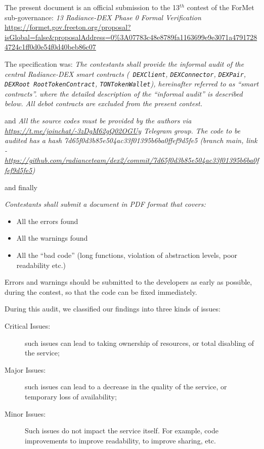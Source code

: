 
The present document is an official submission to the 13$^{th}$
contest of the ForMet sub-governance: {\em 13 Radiance-DEX Phase 0
  Formal Verification}
\url{https://formet.gov.freeton.org/proposal?isGlobal=false&proposalAddress=0%3A07783c48e8789fa1163699e9e3071a47917284724c1ff0d0e54f0d40beb86c07}

  The specification was: {\em The contestants shall provide the
    informal audit of the central Radiance-DEX smart contracts ({\tt
      DEXClient}, {\tt DEXConnector}, {\tt DEXPair}, {\tt DEXRoot
      RootTokenContract}, {\tt TONTokenWallet}), hereinafter referred
    to as ``smart contracts''.  where the detailed description of the
    ``informal audit'' is described below. All debot contracts are
    excluded from the present contest.  }

  and {\em All the source codes must be provided by the authors via
    \url{https://t.me/joinchat/-3zDgM62gQ02OGUy} Telegram group. The code to
    be audited has a hash 7d65f0d3b85e504ac33f01395b6ba0ffef9d5fe5
    (branch main, link -
    \url{https://github.com/radianceteam/dex2/commit/7d65f0d3b85e504ac33f01395b6ba0ffef9d5fe5})
  }

  and finally {\em
Contestants shall submit a document in PDF format that covers:
\begin{itemize}
  \item All the errors found
  \item All the warnings found
  \item All the ``bad code'' (long functions, violation of abstraction levels, poor readability etc.)
\end{itemize}

Errors and warnings should be submitted to the developers as early as
possible, during the contest, so that the code can be fixed
immediately.  }

During this audit, we classified our findings into three kinds of issues:
\begin{description}
\item[Critical Issues:] such issues can lead to taking ownership of resources,
or total disabling of the service;
\item[Major Issues:] such issues can lead to a decrease in the quality of the
service, or temporary loss of availability;
\item[Minor Issues:] Such issues do not impact the service itself. For example,
code improvements to improve readability, to improve sharing, etc.
\end{description}

